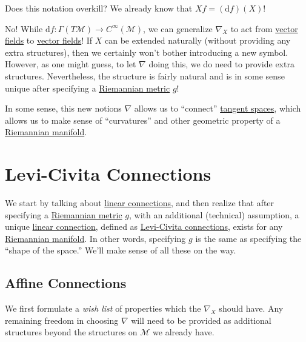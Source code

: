 \begin{problem*}
	Does this notation overkill? We already know that \(Xf = (\mathrm{d} f)(X)\)!
\end{problem*}
\begin{answer}
	No! While \(\mathrm{d} f\colon \Gamma (T \mathcal{M} ) \to C^{\infty} (\mathcal{M} )\), we can generalize \(\nabla _X\) to act from \hyperref[def:vector-field]{vector fields} to \hyperref[def:vector-field]{vector fields}! If \(X\) can be extended naturally (without providing any extra structures), then we certainly won't bother introducing a new symbol. However, as one might guess, to let \(\nabla \) doing this, we do need to provide extra structures. Nevertheless, the structure is fairly natural and is in some sense unique after specifying a \hyperref[def:Riemannian-metric]{Riemannian metric} \(g\)!
\end{answer}

In some sense, this new notions \(\nabla \) allows us to ``connect'' \hyperref[def:tangent-space]{tangent spaces}, which allows us to make sense of ``curvatures'' and other geometric property of a \hyperref[def:Riemannian-manifold]{Riemannian manifold}.

\section{Levi-Civita Connections}
We start by talking about \hyperref[def:linear-connection]{linear connections}, and then realize that after specifying a \hyperref[def:Riemannian-metric]{Riemannian metric} \(g\), with an additional (technical) assumption, a unique \hyperref[def:linear-connection]{linear connection}, defined as \hyperref[def:Levi-Civita-connection]{Levi-Civita connections}, exists for any \hyperref[def:Riemannian-manifold]{Riemannian manifold}. In other words, specifying \(g\) is the same as specifying the ``shape of the space.'' We'll make sense of all these on the way.

\subsection{Affine Connections}
We first formulate a \emph{wish list} of properties which the \(\nabla _X\) should have. Any remaining freedom in choosing \(\nabla \) will need to be provided as additional structures beyond the structures on \(\mathcal{M}\) we already have.

